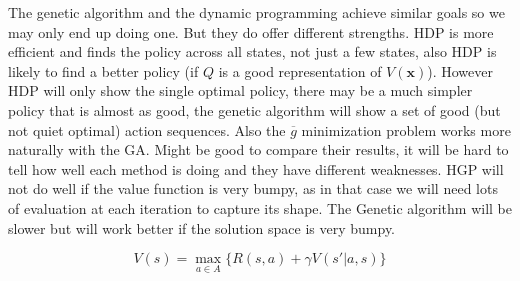 \documentclass[12pt, a4paper]{article}
\begin{document}
The genetic algorithm and the dynamic programming achieve similar goals so we may only end up doing one. But they do offer different strengths. HDP is more efficient and finds the policy across all states, not just a few states, also HDP is likely to find a better policy (if $Q$ is a good representation of $V(\mathbf{x})$). However HDP will only show the single optimal policy, there may be a much simpler policy that is almost as good, the genetic algorithm will show a set of good (but not quiet optimal) action sequences. Also the $\overline{g}$ minimization problem works more naturally with the GA. Might be good to compare their results, it will be hard to tell how well each method is doing and they have different weaknesses. HGP will not do well if the value function is very bumpy, as in that case we will need lots of evaluation at each iteration to capture its shape. The Genetic algorithm will be slower but will work better if the solution space is very bumpy.       

\begin{equation}
	V(s) = \max\limits_{a \in A}\lbrace R(s, a) + \gamma V(s'|a, s) \rbrace 
\end{equation}                  

 

\end{document}
